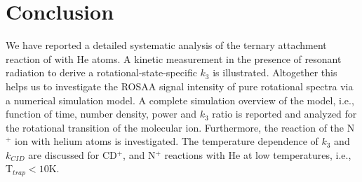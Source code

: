 \section{Conclusion}
\label{sec:CD+_conclusion}

We have reported a detailed systematic analysis of the ternary attachment reaction of \CD with He atoms. A kinetic 
measurement in the presence of resonant radiation to derive a rotational-state-specific $k_3$ is illustrated. 
Altogether this helps us to investigate the ROSAA signal intensity of pure rotational spectra via a numerical 
simulation model. 
A complete simulation overview of the model, i.e., function of time, number density, power and $k_3$ ratio is reported 
and analyzed for the \CDline rotational transition of the \CD molecular ion. Furthermore, the reaction of the N$^+$ ion 
with helium atoms is investigated. The temperature dependence of $k_3$ and $k_{CID}$ are discussed for CD$^+$, and N$^+$ 
reactions with He at low temperatures, i.e., T$_{trap}<10 \text{K}$.
